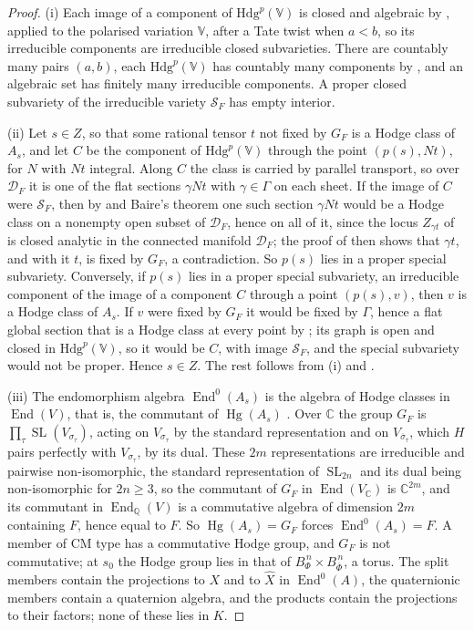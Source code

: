 \documentclass[11pt,reqno]{amsart}
\theoremstyle{plain}
\theoremstyle{definition}
\theoremstyle{remark}
\newcommand{\QQ}{\mathbb{Q}}
\newcommand{\CC}{\mathbb{C}}
\newcommand{\cD}{\mathcal{D}}
\newcommand{\cS}{\mathcal{S}}
\newcommand{\Hdg}{\mathrm{Hdg}}
\DeclareMathOperator{\End}{End}
\DeclareMathOperator{\Hg}{Hg}
\DeclareMathOperator{\SL}{SL}
\newcommand{\bbar}[1]{\overline{#1}}
\begin{document}
\begin{proof}
(i) Each image of a component of $\Hdg^{p}(\mathbb{V})$ is closed and
algebraic by , applied to the polarised variation
$\mathbb{V}$, after a Tate twist when $a<b$, so its irreducible
components are irreducible closed subvarieties. There are countably many
pairs $(a,b)$, each $\Hdg^{p}(\mathbb{V})$ has countably many components by
, and an algebraic set has finitely many irreducible
components. A proper closed subvariety of the irreducible variety
$\cS_{F}$ has empty interior.

(ii) Let $s\in Z$, so that some rational tensor $t$ not fixed by $G_{F}$ is a
Hodge class of $A_{s}$, and let $C$ be the component of
$\Hdg^{p}(\mathbb{V})$ through the point $(p(s),Nt)$, for $N$ with $Nt$
integral. Along $C$ the class is carried by parallel transport, so over
$\cD_{F}$ it is one of the flat sections $\gamma Nt$ with $\gamma\in\Gamma$ on
each sheet. If the image of $C$ were $\cS_{F}$, then by 
and Baire's theorem one such section $\gamma Nt$ would be a Hodge class on a
nonempty open subset of $\cD_{F}$, hence on all of it, since the locus
$Z_{\gamma t}$ of  is closed analytic in the connected
manifold $\cD_{F}$; the proof of  then shows that
$\gamma t$, and with it $t$, is fixed by $G_{F}$, a contradiction. So $p(s)$ lies in a proper
special subvariety. Conversely, if $p(s)$ lies in a proper special
subvariety, an irreducible component of the image of a component $C$
through a point $(p(s),v)$, then $v$ is a Hodge class of $A_{s}$. If $v$
were fixed by $G_{F}$ it would be fixed by $\Gamma$, hence a flat global
section that is a Hodge class at every point by ; its
graph is open and closed in $\Hdg^{p}(\mathbb{V})$, so it would be $C$, with
image $\cS_{F}$, and the special subvariety would not be proper. Hence $s\in Z$.
The rest follows from (i) and .

(iii) The endomorphism algebra $\End^{0}(A_{s})$ is the algebra of Hodge
classes in $\End(V)$, that is, the commutant of $\Hg(A_{s})$
\cite[\S3]{Del82}. Over $\CC$ the group $G_{F}$ is
$\prod_{\tau}\SL(V_{\sigma_{\tau}})$, acting on $V_{\sigma_{\tau}}$ by the
standard representation and on $V_{\bbar\sigma_{\tau}}$, which $H$ pairs
perfectly with $V_{\sigma_{\tau}}$, by its dual. These $2m$ representations
are irreducible and pairwise non-isomorphic, the standard representation of
$\SL_{2n}$ and its dual being non-isomorphic for $2n\ge3$, so the commutant
of $G_{F}$ in $\End(V_{\CC})$ is $\CC^{2m}$, and its commutant in
$\End_{\QQ}(V)$ is a commutative algebra of dimension $2m$ containing $F$,
hence equal to $F$. So $\Hg(A_{s})=G_{F}$ forces $\End^{0}(A_{s})=F$. A
member of CM type has a commutative Hodge group, and $G_{F}$ is not
commutative; at $s_{0}$ the Hodge group lies in that of
$B_{\Phi}^{\,n}\times B_{\bbar\Phi}^{\,n}$, a torus. The split members
contain the projections to $X$ and to $\widehat{X}$ in
$\End^{0}(A)$, the quaternionic members contain a quaternion algebra, and
the products contain the projections to their factors; none of these lies
in $K$.


\end{proof}
\end{document}
